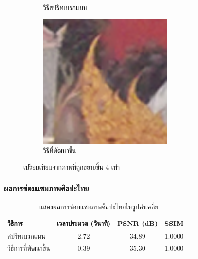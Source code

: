 \documentclass[xcolor=dvipsnames, xetex,serif]{beamer}
\numberwithin{equation}{section}
\begin{document}
\begin{frame}
\begin{figure}[H]
\begin{subfigure}{0.4\linewidth}
                \caption{วิธีสปริทเบรกแมน}
            \end{subfigure}
            \begin{subfigure}{0.4\linewidth}
                \centering
                \includegraphics[width=0.6\linewidth]{images/result_ex4_scaleup/multisplitbregman.png}	
                \caption{วิธีที่พัฒนาขึ้น}
            \end{subfigure}
            \caption{เปรียบเทียบจากภาพที่ถูกขยายขึ้น 4 เท่า}
        \end{figure}
    \end{frame}
    \begin{frame}
        \frametitle{ผลการซ่อมแซมภาพศิลปะไทย}
        \begin{table}[H]
            \centering
            \begin{tabular}[ht]{|l|c|c|c|c|}
                \hline
                วิธีการ  & เวลาประมวล  (วินาที) & PSNR (dB) & SSIM \\
                \hline
                สปริทเบรกแมน & 2.72 & 34.89 & 1.0000 \\ 
                วิธีการที่พัฒนาขึ้น & 0.39 & 35.30 & 1.0000 \\
                \hline
            \end{tabular}
            \caption{แสดงผลการซ่อมแซมภาพศิลปะไทยในรูปค่าเฉลี่ย}
            \label{result:table-thaiart-summary}
        \end{table}	
    \end{frame}
\end{document}
